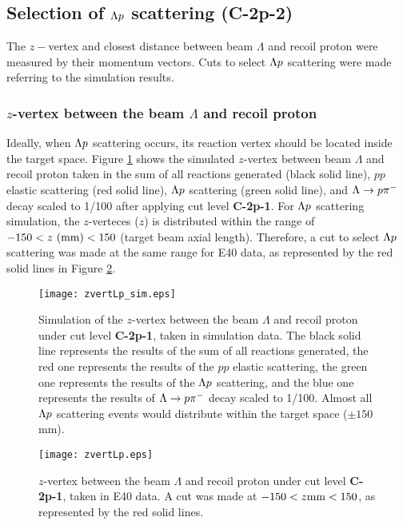 

\clearpage
\subsection{Selection of $\Lambda p$ scattering ({\bf C-2p-2})}
The $z-$vertex and closest distance between beam $\Lambda$ and recoil proton were measured by their momentum vectors. Cuts to select $\Lambda p$ scattering were made referring to the simulation results. 

\subsubsection{$z$-vertex between the beam $\Lambda$ and recoil proton}

Ideally, when $\Lambda p$ scattering occurs, its reaction vertex should be located inside the target space. Figure \ref{fig-zvertLp_sim} shows the simulated $z$-vertex between beam $\Lambda$ and recoil proton taken in the sum of all reactions generated (black solid line), $pp$ elastic scattering (red solid line), $\Lambda p$ scattering (green solid line), and $\Lambda\to p\pi^{-}$ decay scaled to 1/100 after applying cut level {\bf C-2p-1}. For $\Lambda p$ scattering simulation, the $z$-verteces ($z$) is distributed within the range of $-150< z\ {\rm (mm)} <150$ (target beam axial length). Therefore, a cut to select $\Lambda p$ scattering was made at the same range for E40 data, as represented by the red solid lines in Figure \ref{fig-zvertLp}.

\begin{figure}[h]
  \centering
  \texttt{[image: zvertLp\_sim.eps]}
  \caption{Simulation of the $z$-vertex between the beam $\Lambda$ and recoil proton under cut level {\bf C-2p-1}, taken in simulation data. The black solid line represents the results of the sum of all reactions generated, the red one represents the results of the $pp$ elastic scattering, the green one represents the results of the $\Lambda p$ scattering, and the blue one represents the results of $\Lambda\to p\pi^{-}$ decay scaled to 1/100. Almost all $\Lambda p$ scattering events would distribute within the target space ($\pm150$ mm).}
  \label{fig-zvertLp_sim}
\end{figure}

\begin{figure}[h]
  \centering
  \texttt{[image: zvertLp.eps]}
  \caption{$z$-vertex between the beam $\Lambda$ and recoil proton under cut level {\bf C-2p-1}, taken in E40 data. A cut was made at $-150 < z {\rm mm} < 150$, as represented by the red solid lines.}
  \label{fig-zvertLp}
\end{figure}


